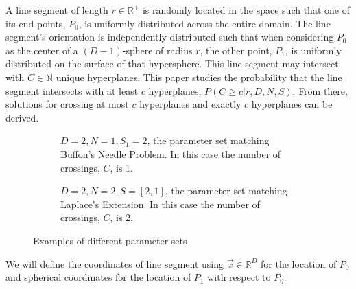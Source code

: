\documentclass{article}
\begin{document}
A line segment of length $r\in\mathbb{R}^+$ is randomly located in the space such that one of its end points, $P_0$, is uniformly distributed
across the entire domain. The line segment's orientation is independently distributed such that when considering $P_0$ as the center of a $(D-1)$-sphere of radius $r$, the other point, $P_1$,
is uniformly distributed on the surface of that hypersphere. This line segment may intersect with $C\in\mathbb{N}$ unique hyperplanes. This paper studies the probability that the line segment
intersects with at least $c$ hyperplanes, $P(C\ge c|r, D, N, S)$. From there, solutions for crossing at most $c$ hyperplanes and exactly $c$ hyperplanes can
be derived.
\begin{figure}[H]
	\centering
	\begin{subfigure}{0.45\textwidth}
		\centering
		\caption{$D=2, N=1, S_1=2$, the parameter set matching Buffon's Needle Problem. In this case the number of crossings, $C$, is 1.}
		\label{fig:buffon example}
	\end{subfigure}
	\hspace{1cm}
	\begin{subfigure}{0.45\textwidth}
		\centering
		\caption{$D=2, N=2, S=[2,1]$, the parameter set matching Laplace's Extension. In this case the number of crossings, $C$, is 2.}
		\label{fig:laplace example}
	\end{subfigure}
	\caption{Examples of different parameter sets}
\end{figure}

We will define the coordinates of line segment using $\vec{x}\in\mathbb{R}^D$ for the location of $P_0$ and spherical coordinates \citep{spherical_coordinates} for the location of $P_1$ with respect to $P_0$.
\end{document}
